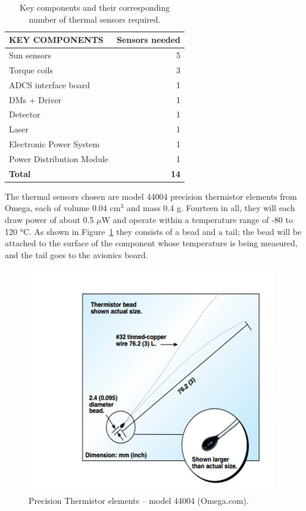 \documentclass[12pt]{article}
\begin{document}
\begin{table}[ht]%
\centering
\caption{Key components and their corresponding number of thermal sensors required.}
\label{table:thermal-sensors}
\begin{tabular}{|l|r|}\hline
\textbf{KEY COMPONENTS} & \textbf{Sensors needed} \\\hline
Sun sensors & 5 \\\hline
Torque coils & 3 \\\hline
ADCS interface board & 1 \\\hline
DMs + Driver & 1 \\\hline
Detector & 1 \\\hline
Laser & 1 \\\hline
Electronic Power System & 1 \\\hline
Power Distribution Module & 1 \\\hline
\textbf{Total} & \textbf{14} \\\hline
\end{tabular}
\end{table}

The thermal sensors chosen are model 44004 precision thermistor elements from Omega, each of volume 0.04 cm$^3$ and mass 0.4 g. Fourteen in all, they will each draw power of about 0.5 $\mu$W and operate within a temperature range of -80 to 120 °C. As shown in Figure~\ref{fig:thermal-thermistor} they consists of a bead and a tail; the bead will be attached to the surface of the component whose temperature is being measured, and the tail goes to the avionics board.

\begin{figure}[ht]%
\centering
\includegraphics{images/thermal-thermistor}%
\caption{Precision Thermistor elements -- model 44004 (Omega.com).\cite{omega}}%
\label{fig:thermal-thermistor}%
\end{figure}
\end{document}

